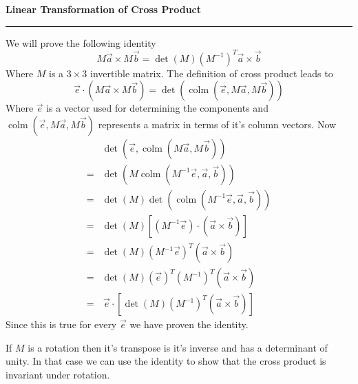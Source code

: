 \documentclass[a4paper, 11pt]{article}
\DeclareMathOperator{\colm}{colm}
\begin{document}
\begin{center}
	\Large\bfseries Linear Transformation of Cross Product
	\vspace{.15em}\hrule
\end{center}

We will prove the following identity
\begin{equation}
	M \vec a \times M \vec b = \det (M) (M^{-1})^T \vec a \times \vec b
\end{equation}
Where $M$ is a $3 \times 3$ invertible matrix. The definition of cross product leads to
\begin{equation}
	\vec e \cdot (M \vec a \times M \vec b) = \det ( \colm(\vec e, M \vec a, M \vec b))
\end{equation}
Where $\vec e$ is a vector used for determining the components and $\colm(\vec e, M \vec a, M \vec
b)$ represents a matrix in terms of it's column vectors. Now
\begin{align*}
	&\det (\vec e, \colm(M \vec a, M \vec b)) \\
	=& \det ( M \colm(M^{-1} \vec e, \vec a, \vec b) ) \\
	=& \det (M) \det(\colm(M^{-1} \vec e, \vec a, \vec b)) \\
	=& \det (M) [ (M^{-1} \vec e) \cdot (\vec a \times \vec b) ] \\
	=& \det (M) (M^{-1} \vec e)^T (\vec a \times \vec b) \\
	=& \det(M) (\vec e)^T (M^{-1})^T (\vec a \times \vec b) \\
	=& \, \vec e \cdot [ \det(M) (M^{-1})^T (\vec a \times \vec b) ]
\end{align*}
Since this is true for every $\vec e$ we have proven the identity.

If $M$ is a rotation then it's transpose is it's inverse and has a determinant of unity. In that case
we can use the identity to show that the cross product is invariant under rotation.
\end{document}
